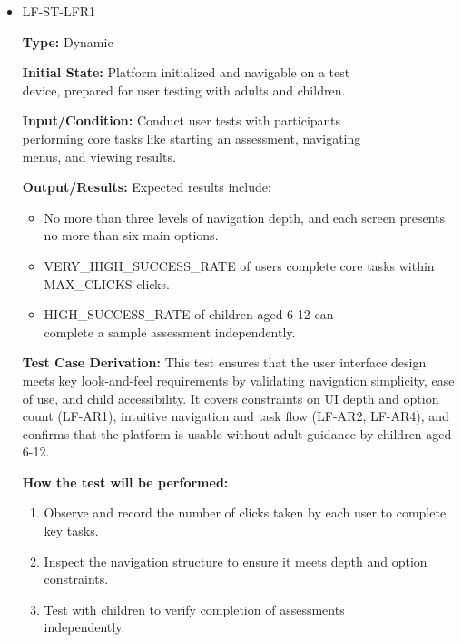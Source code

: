 \documentclass[12pt, titlepage]{article}
\begin{document}
\begin{itemize} 
  \item LF-ST-LFR1
  \begin{mdframed}[linewidth=0.5mm] 
    \textbf{Type:} Dynamic \par 
    \textbf{Initial State:} Platform initialized and navigable on a test \\device, prepared for user testing with adults and children. \par 
    \textbf{Input/Condition:} Conduct user tests with participants \\performing core tasks like starting an assessment, navigating \\menus, and viewing results. \par 
    \textbf{Output/Results:} Expected results include: 
    \begin{itemize} 
      \item No more than three levels of navigation depth, and each screen presents no more than six main options. 
      \item VERY\_HIGH\_SUCCESS\_RATE of users complete core tasks within\\
      MAX\_CLICKS clicks. 
      \item HIGH\_SUCCESS\_RATE of children aged 6-12 can \\complete a sample assessment independently. 
    \end{itemize} \par
    \textbf{Test Case Derivation:} This test ensures that the user interface design meets key look-and-feel requirements by validating navigation simplicity, ease of use, and child accessibility. It covers constraints on UI depth and option count (LF-AR1), intuitive navigation and task flow (LF-AR2, LF-AR4), and confirms that the platform is usable without adult guidance by children aged 6-12. \par
    \textbf{How the test will be performed:} 
    \begin{enumerate}[noitemsep] 
      \item Observe and record the number of clicks taken by each user to complete key tasks. 
      \item Inspect the navigation structure to ensure it meets depth and option \\constraints. 
      \item Test with children to verify completion of assessments \\independently. 
    \end{enumerate} 
  \end{mdframed}


\end{itemize}
\end{document}
